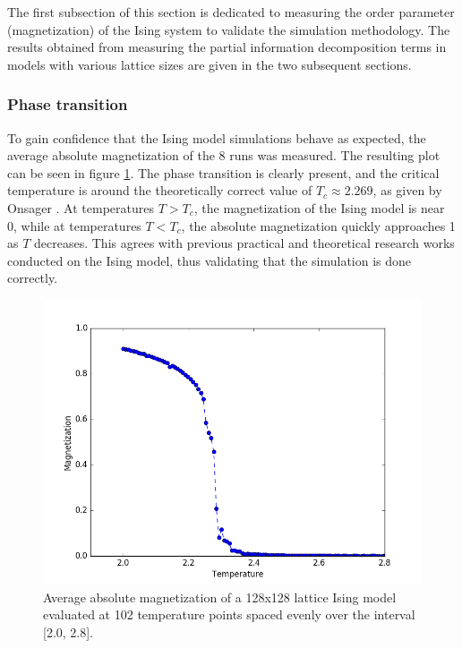 \documentclass[12pt]{article}
\begin{document}
The first subsection of this section is dedicated to measuring the order parameter (magnetization) of the Ising system to validate the simulation methodology. The results obtained from measuring the partial information decomposition terms in models with various lattice sizes are given in the two subsequent sections.

\subsubsection{Phase transition} 

To gain confidence that the Ising model simulations behave as expected, the average absolute magnetization of the 8 runs was measured. The resulting plot can be seen in figure \ref{fig:ising-128-mags}. The phase transition is clearly present, and the critical temperature is around the theoretically correct value of $T_c \approx 2.269$, as given by Onsager \cite{lars-onsanger}. At temperatures $T > T_c$, the magnetization of the Ising model is near 0, while at temperatures $T < T_c$, the absolute magnetization quickly approaches 1 as $T$ decreases. This agrees with previous practical and theoretical research works conducted on the Ising model, thus validating that the simulation is done correctly.

\begin{figure} [h!]
\begin{center}
\includegraphics[width=\textwidth]{ising-128-mags}
\caption{Average absolute magnetization of a 128x128 lattice Ising model evaluated at 102 temperature points spaced evenly over the interval [2.0, 2.8].}
\label{fig:ising-128-mags}
\end{center}
\end{figure}
\end{document}
